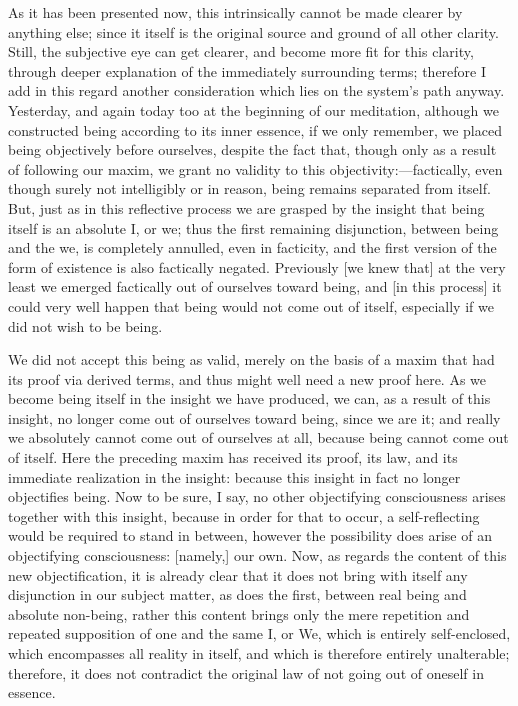 As it has been presented now,
this intrinsically cannot be made clearer by anything else;
since it itself is the original source
and ground of all other clarity.
Still, the subjective eye can get clearer,
and become more fit for this clarity,
through deeper explanation of the immediately surrounding terms;
therefore I add in this regard another consideration
which lies on the system's path anyway.
Yesterday, and again today too at the beginning of our meditation,
although we constructed being according to its inner essence,
if we only remember, we placed being objectively before ourselves,
despite the fact that, though only as a result of following our maxim,
we grant no validity to this objectivity:—factically,
even though surely not intelligibly or in reason,
being remains separated from itself.
But, just as in this reflective process we are
grasped by the insight that being itself is an absolute I, or we;
thus the first remaining disjunction,
between being and the we, is completely annulled, even in facticity,
and the first version of the form of existence is also factically negated.
Previously [we knew that] at the very least
we emerged factically out of ourselves toward being,
and [in this process] it could very well happen that
being would not come out of itself,
especially if we did not wish to be being.

We did not accept this being as valid,
merely on the basis of a maxim
that had its proof via derived terms,
and thus might well need a new proof here.
As we become being itself in the insight we have produced,
we can, as a result of this insight, no longer come out
of ourselves toward being, since we are it;
and really we absolutely cannot come out of ourselves at all,
because being cannot come out of itself.
Here the preceding maxim has received its proof,
its law, and its immediate realization in the insight:
because this insight in fact no longer objectifies being.
Now to be sure, I say, no other objectifying consciousness arises
together with this insight, because in order for that to occur,
a self-reflecting would be required to stand in between,
however the possibility does arise of an objectifying consciousness:
[namely,] our own.
Now, as regards the content of this new objectification,
it is already clear that it does not bring with itself
any disjunction in our subject matter,
as does the first, between real being and absolute non-being,
rather this content brings only the mere repetition
and repeated supposition of one and the same I, or We,
which is entirely self-enclosed, which encompasses all reality in itself,
and which is therefore entirely unalterable;
therefore, it does not contradict the original law
of not going out of oneself in essence.

